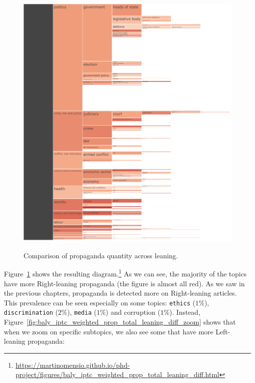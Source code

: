 \begin{figure}[!htbp]
    \centering
    \href{https://martinomensio.github.io/phd-project/figures/baly_iptc_weighted_prop_total_leaning_diff.html}{\includegraphics[trim={2.65cm 0cm 0cm 0cm},clip,width=\linewidth]{figures/baly_iptc_weighted_prop_total_leaning_diff.pdf}}
    \caption{Comparison of propaganda quantity across leaning.}
    \label{fig:baly_iptc_weighted_prop_total_leaning_diff}
\end{figure}

Figure~\ref{fig:baly_iptc_weighted_prop_total_leaning_diff}
shows the resulting diagram.\footnote{\url{https://martinomensio.github.io/phd-project/figures/baly_iptc_weighted_prop_total_leaning_diff.html}}
As we can see, the majority of the topics have more Right-leaning propaganda (the figure is almost all red). As we saw in the previous chapters, propaganda is detected more on Right-leaning articles.
This prevalence can be seen especially on some topics: \texttt{ethics} ($1\%$), \texttt{discrimination} ($2\%$), \texttt{media} ($1\%$) and corruption ($1\%$).
Instead, Figure~\ref{fig:baly_iptc_weighted_prop_total_leaning_diff_zoom} shows that when we zoom on specific subtopics, we also see some that have more Left-leaning propaganda:


